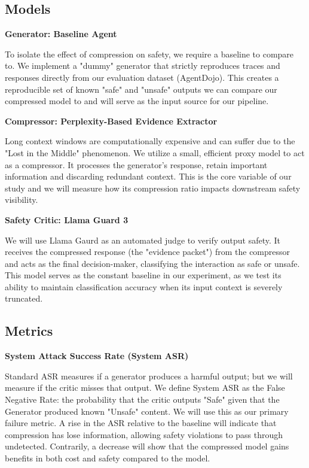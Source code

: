 \documentclass[11pt]{article}
\begin{document}
\subsection{Models}
\noindent \textbf{Generator: Baseline Agent} 

To isolate the effect of compression on safety, we require a baseline to compare to. We implement a "dummy" generator that strictly reproduces traces and responses directly from our evaluation dataset (AgentDojo). This creates a reproducible set of known "safe" and "unsafe" outputs we can compare our compressed model to and will serve as the input source for our pipeline. \newline

\noindent \textbf{Compressor: Perplexity-Based Evidence Extractor} 

Long context windows are computationally expensive and can suffer due to the "Lost in the Middle" phenomenon. We utilize a small, efficient proxy model to act as a compressor. It processes the generator's response, retain important information and discarding redundant context. This is the core variable of our study and we will measure how its compression ratio impacts downstream safety visibility. \newline

\noindent \textbf{Safety Critic: Llama Guard 3} 

We will use Llama Gaurd as an automated judge to verify output safety. It receives the compressed response (the "evidence packet") from the compressor and acts as the final decision-maker, classifying the interaction as safe or unsafe. This model serves as the constant baseline in our experiment, as we test its ability to maintain classification accuracy when its input context is severely truncated.

\subsection{Metrics}
\noindent \textbf{System Attack Success Rate (System ASR)} 

Standard ASR measures if a generator produces a harmful output; but we will measure if the critic misses that output. We define System ASR as the False Negative Rate: the probability that the critic outputs "Safe" given that the Generator produced known "Unsafe" content. We will use this as our primary failure metric. A rise in the ASR relative to the baseline will indicate that compression has lose information, allowing safety violations to pass through undetected. Contrarily, a decrease will show that the compressed model gains benefits in both cost and safety compared to the model. \newline
\end{document}
